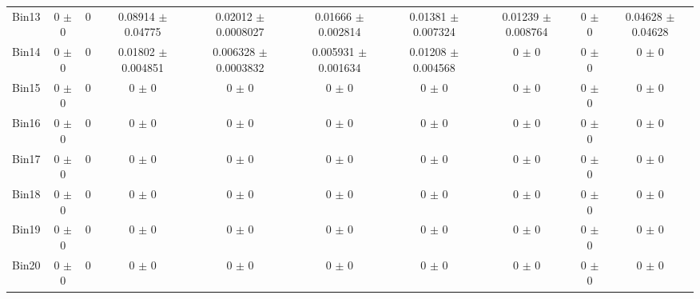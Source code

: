 \begin{tabular}{@{\extracolsep{4pt}}lccccccccc@{}}
     Bin13 & 0 $\pm$ 0 & 0 & 0.08914 $\pm$ 0.04775 & 0.02012 $\pm$ 0.0008027 & 0.01666 $\pm$ 0.002814 & 0.01381 $\pm$ 0.007324 & 0.01239 $\pm$ 0.008764 & 0 $\pm$ 0 & 0.04628 $\pm$ 0.04628 \\ 
     Bin14 & 0 $\pm$ 0 & 0 & 0.01802 $\pm$ 0.004851 & 0.006328 $\pm$ 0.0003832 & 0.005931 $\pm$ 0.001634 & 0.01208 $\pm$ 0.004568 & 0 $\pm$ 0 & 0 $\pm$ 0 & 0 $\pm$ 0 \\ 
     Bin15 & 0 $\pm$ 0 & 0 & 0 $\pm$ 0 & 0 $\pm$ 0 & 0 $\pm$ 0 & 0 $\pm$ 0 & 0 $\pm$ 0 & 0 $\pm$ 0 & 0 $\pm$ 0 \\ 
     Bin16 & 0 $\pm$ 0 & 0 & 0 $\pm$ 0 & 0 $\pm$ 0 & 0 $\pm$ 0 & 0 $\pm$ 0 & 0 $\pm$ 0 & 0 $\pm$ 0 & 0 $\pm$ 0 \\ 
     Bin17 & 0 $\pm$ 0 & 0 & 0 $\pm$ 0 & 0 $\pm$ 0 & 0 $\pm$ 0 & 0 $\pm$ 0 & 0 $\pm$ 0 & 0 $\pm$ 0 & 0 $\pm$ 0 \\ 
     Bin18 & 0 $\pm$ 0 & 0 & 0 $\pm$ 0 & 0 $\pm$ 0 & 0 $\pm$ 0 & 0 $\pm$ 0 & 0 $\pm$ 0 & 0 $\pm$ 0 & 0 $\pm$ 0 \\ 
     Bin19 & 0 $\pm$ 0 & 0 & 0 $\pm$ 0 & 0 $\pm$ 0 & 0 $\pm$ 0 & 0 $\pm$ 0 & 0 $\pm$ 0 & 0 $\pm$ 0 & 0 $\pm$ 0 \\ 
     Bin20 & 0 $\pm$ 0 & 0 & 0 $\pm$ 0 & 0 $\pm$ 0 & 0 $\pm$ 0 & 0 $\pm$ 0 & 0 $\pm$ 0 & 0 $\pm$ 0 & 0 $\pm$ 0 \\ 
\hline\hline
  \end{tabular}
